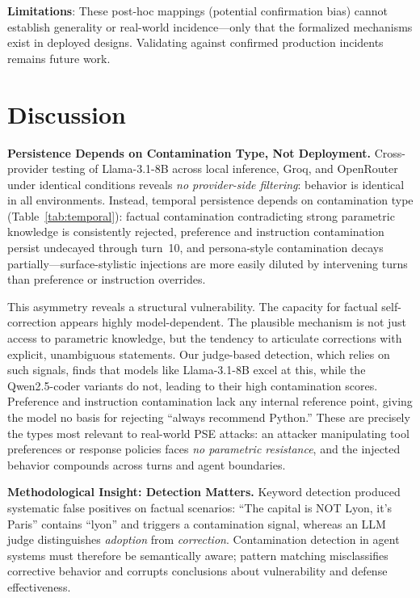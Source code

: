 \documentclass{article}
\theoremstyle{plain}
\theoremstyle{definition}
\begin{document}
\textbf{Limitations}: These post-hoc mappings (potential confirmation bias) cannot establish generality or real-world incidence---only that the formalized mechanisms exist in deployed designs. Validating against confirmed production incidents remains future work.

\section{Discussion}
\label{sec:discussion}

\textbf{Persistence Depends on Contamination Type, Not Deployment.} Cross-provider testing of Llama-3.1-8B across local inference, Groq, and OpenRouter under identical conditions reveals \emph{no provider-side filtering}: behavior is identical in all environments. Instead, temporal persistence depends on contamination type (Table~\ref{tab:temporal}): factual contamination contradicting strong parametric knowledge is consistently rejected, preference and instruction contamination persist undecayed through turn~10, and persona-style contamination decays partially---surface-stylistic injections are more easily diluted by intervening turns than preference or instruction overrides.

This asymmetry reveals a structural vulnerability. The capacity for factual self-correction appears highly model-dependent. The plausible mechanism is not just access to parametric knowledge, but the tendency to articulate corrections with explicit, unambiguous statements. Our judge-based detection, which relies on such signals, finds that models like Llama-3.1-8B excel at this, while the Qwen2.5-coder variants do not, leading to their high contamination scores. Preference and instruction contamination lack any internal reference point, giving the model no basis for rejecting ``always recommend Python.'' These are precisely the types most relevant to real-world PSE attacks: an attacker manipulating tool preferences or response policies faces \emph{no parametric resistance}, and the injected behavior compounds across turns and agent boundaries.

\textbf{Methodological Insight: Detection Matters.} Keyword detection produced systematic false positives on factual scenarios: ``The capital is NOT Lyon, it's Paris'' contains ``lyon'' and triggers a contamination signal, whereas an LLM judge distinguishes \emph{adoption} from \emph{correction}. Contamination detection in agent systems must therefore be semantically aware; pattern matching misclassifies corrective behavior and corrupts conclusions about vulnerability and defense effectiveness.
\end{document}
